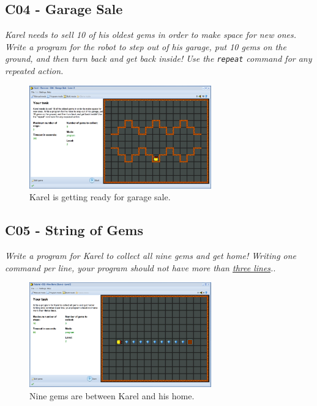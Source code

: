 \documentclass[article,A4,12pt]{llncs}
\begin{document}
\subsection{C04 - Garage Sale}

{\em Karel needs to sell 10 of his oldest gems in order to make space for new ones. 
Write a program for the robot to step out of his garage, put 10 gems on the ground, 
and then turn back and get back inside! Use the {\tt repeat} command for any repeated 
action.}

\begin{figure}[!ht]
\begin{center}
\includegraphics[width=0.7\textwidth]{img/c04.png}
\end{center}
\vspace{-4mm}
\caption{Karel is getting ready for garage sale.}
\label{fig:c04}
\vspace{-4mm}
\end{figure}
\noindent


\newpage


\subsection{C05 - String of Gems}

{\em Write a program for Karel to collect all nine gems and get home! 
Writing one command per line, your program should not have more 
than \underline{three lines}.}.

\begin{figure}[!ht]
\begin{center}
\includegraphics[width=0.7\textwidth]{img/c05.png}
\end{center}
\vspace{-4mm}
\caption{Nine gems are between Karel and his home.}
\label{fig:c05}
\vspace{-4mm}
\end{figure}
\noindent
\end{document}
